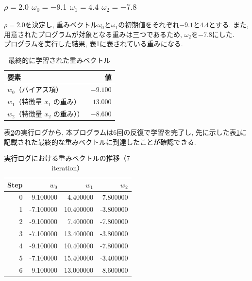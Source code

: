 \documentclass[a4j, 12pt]{jarticle}
\begin{document}
\subsubsection{$\rho=2.0$ $\omega_0=-9.1$ $\omega_1=4.4$ $\omega_2=-7.8$}
$\rho=2.0$を決定し, 重みベクトル$\omega_0$と$\omega_1$の初期値をそれぞれ$-9.1$と$4.4$とする. また, 用意されたプログラムが対象となる重みは三つであるため, $\omega_2$を$-7.8$にした. \\
プログラムを実行した結果, 表\ref{self2finalweights}に表されている重みになる. 
\begin{table}[H]
  \centering
  \caption{最終的に学習された重みベクトル}\label{self2finalweights}
  \begin{tabular}{l r}
    \hline
    要素 & 値 \\
    \hline
    $w_0$（バイアス項） & $-9.100$ \\
    $w_1$（特徴量 $x_1$ の重み） & $13.000$ \\
    $w_2$（特徴量 $x_2$ の重み）） & $-8.600$ \\
    \hline
  \end{tabular}
\end{table}
表\ref{self2logs}の実行ログから, 本プログラムは6回の反復で学習を完了し, 先に示した表\ref{self2finalweights}に記載された最終的な重みベクトルに到達したことが確認できる.
\begin{table}[H]
  \centering
  \caption{実行ログにおける重みベクトルの推移（7\,iteration）}\label{self2logs}
  \begin{tabular}{r|rrr}
  \hline
  Step & $w_0$ & $w_1$ & $w_2$ \\
  \hline
   0 & -9.100000 &  4.400000 & -7.800000 \\
   1 & -7.100000 & 10.400000 & -3.800000 \\
   2 & -9.100000 &  7.400000 & -7.800000 \\
   3 & -7.100000 & 13.400000 & -3.800000 \\
   4 & -9.100000 & 10.400000 & -7.800000 \\
   5 & -7.100000 & 15.400000 & -3.400000 \\
   6 & -9.100000 & 13.000000 & -8.600000 \\
  \hline
  \end{tabular}
\end{table}
\end{document}
